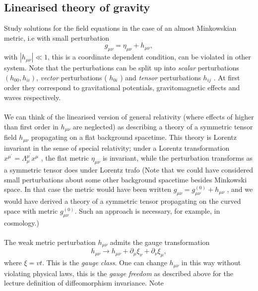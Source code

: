\subsection{Linearised theory of gravity}
Study solutions for the field equations in the case of an almost Minkowskian metric, i.e with small perturbation
\begin{equation}
g_{\mu \nu} = \eta_{\mu \nu} + h_{\mu \nu}, 
\end{equation}
with $|h_{\mu \nu}|\ll 1$, this is a coordinate dependent condition, can be violated in other system.
Note that the perturbations
can be split up into \emph{scalar} perturbations $( h_{ 00} , h_{ii} )$, \emph{vector} perturbations ( $h_{0i}$ ) and \emph{tensor} perturbations $h_{i j}$ . At
first order they correspond to gravitational potentials, gravitomagnetic effects and waves respectively.\\
 \\
We can think of
the linearised version of general relativity (where effects of higher than first order in $h_{μν}$
are neglected) as describing a theory of a symmetric tensor field $h_{μν}$ propagating on a flat
background spacetime. This theory is Lorentz invariant in the sense of special relativity;
under a Lorentz transformation $x^{μ^\prime} = Λ^{\mu^\prime}_μ x^μ$ , the flat metric $η_{μν}$ is invariant, while the
perturbation transforms as a symmetric tensor does under Lorentz trafo
(Note that we could have considered small perturbations about some other background
spacetime besides Minkowski space. In that case the metric would have been written $g_{μν} =g^{(0)}_{μν}+ h_{μν}$ , and we would have derived a theory of a symmetric tensor propagating on the
curved space with metric $g^{(0)}_{ μν}$. Such an approach is necessary, for example, in cosmology.)
\\
\\
The weak metric perturbation $h_{\mu \nu}$ admits the gauge transformation
\begin{equation}
	h_{\mu \nu} \rightarrow h_{\mu \nu} + \partial_{\mu} \xi_{\nu} + \partial_{\nu} \xi_{\mu},
\end{equation}
where $\xi=vt$. This is the \emph{gauge class}. One can change $h_{\mu \nu}$ in this way without violating physical laws, this is the \emph{gauge freedom} as described above for the lecture definition of diffeomorphism invariance. Note
